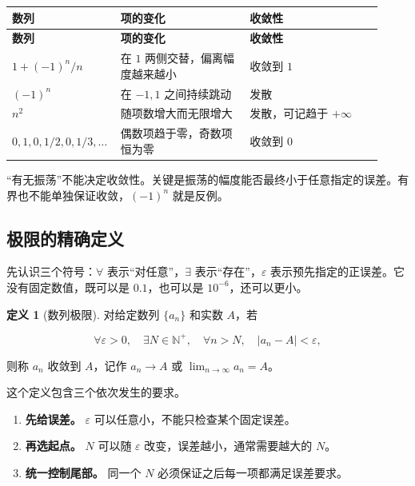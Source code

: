 \documentclass[UTF8,fontset=fandol,12pt,oneside,openany]{ctexrep}
\theoremstyle{definition}
\newtheorem{definition}[theorem]{定义}
\begin{document}
{\small\begin{longtable}{>{\raggedright\arraybackslash}p{0.23\linewidth}>{\raggedright\arraybackslash}p{0.34\linewidth}>{\raggedright\arraybackslash}p{0.35\linewidth}}
\toprule
\textbf{数列} & \textbf{项的变化} & \textbf{收敛性} \\
\midrule\endfirsthead
\toprule
\textbf{数列} & \textbf{项的变化} & \textbf{收敛性} \\
\midrule\endhead
$1+(-1)^n/n$ & 在 $1$ 两侧交替，偏离幅度越来越小 & 收敛到 $1$ \\
$(-1)^n$ & 在 $-1,1$ 之间持续跳动 & 发散 \\
$n^2$ & 随项数增大而无限增大 & 发散，可记趋于 $+\infty$ \\
$0,1,0,1/2,0,1/3,\ldots$ & 偶数项趋于零，奇数项恒为零 & 收敛到 $0$ \\
\bottomrule\end{longtable}}

“有无振荡”不能决定收敛性。关键是振荡的幅度能否最终小于任意指定的误差。有界也不能单独保证收敛，$(-1)^n$ 就是反例。

\subsection{极限的精确定义}

先认识三个符号：$\forall$ 表示“对任意”，$\exists$ 表示“存在”，$\varepsilon$ 表示预先指定的正误差。它没有固定数值，既可以是 $0.1$，也可以是 $10^{-6}$，还可以更小。

\begin{definition}[数列极限]
对给定数列 $\{a_n\}$ 和实数 $A$，若

\begin{equation}\forall\varepsilon>0,\quad\exists N\in\mathbb N^+,\quad\forall n>N,\quad |a_n-A|<\varepsilon,\label{lec:02:definition}\end{equation}

则称 $a_n$ 收敛到 $A$，记作 $a_n\to A$ 或 $\lim_{n\to\infty}a_n=A$。
\end{definition}

这个定义包含三个依次发生的要求。

\begin{enumerate}
\item \textbf{先给误差。} $\varepsilon$ 可以任意小，不能只检查某个固定误差。
\item \textbf{再选起点。} $N$ 可以随 $\varepsilon$ 改变，误差越小，通常需要越大的 $N$。
\item \textbf{统一控制尾部。} 同一个 $N$ 必须保证之后每一项都满足误差要求。
\end{enumerate}
\end{document}
